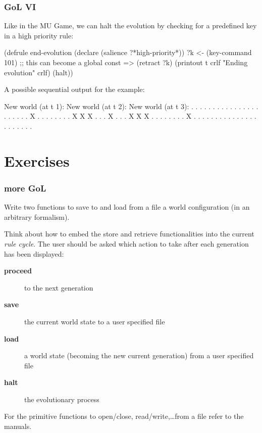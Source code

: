 \documentclass[xcolor={usenames,dvipsnames,svgnames}, compress]{beamer}
\begin{document}
\begin{frame}[fragile]
  \frametitle{GoL VI}
  Like in the MU Game, we can halt the evolution by checking for a
  predefined key in a high priority rule:
  \begin{clips-code}[numbers=none]
    (defrule end-evolution
        (declare (salience ?*high-priority*))
        ?k <- (key-command 101) ;; this can become a global const
        =>
        (retract ?k)
        (printout t crlf "Ending evolution" crlf)
        (halt))
      \end{clips-code}
      
 A possible sequential output for the example:
 \begin{clips-code}[numbers=none]
    New world (at t 1):    New world (at t 2):   New world (at t 3):       
    .  .  .  .  .          .  .  .  .  .         .  .  .  .  .         
    .  .  .  .  .          .  .  X  .  .         .  .  .  .  .         
    .  X  X  X  .          .  .  X  .  .         .  X  X  X  .         
    .  .  .  .  .          .  .  X  .  .         .  .  .  .  .         
    .  .  .  .  .          .  .  .  .  .         .  .  .  .  .         
  \end{clips-code}
      
\end{frame}

\section{Exercises}
{
  \begin{frame}
    \sectionpage
  \end{frame}
}

\begin{frame}
  \frametitle{more GoL}
  Write two functions to save to and load from a file a world
  configuration (in an arbitrary formalism).\par\bigskip

  Think about how to embed the store and retrieve functionalities into
  the current \emph{rule cycle}.
  The user should be asked which action to take after each
  generation has been displayed:
  \begin{description}
  \item[\textbf{proceed}] to the next generation
  \item[\textbf{save}] the current world state to a user specified file
  \item[\textbf{load}] a world state (becoming the new current generation) from a user specified file
  \item[\textbf{halt}] the evolutionary process
  \end{description}\bigskip

  For the primitive functions to \textsf{open/close}, \textsf{read/write},\dots from a
  file refer to the manuals.
\end{frame}
\end{document}
